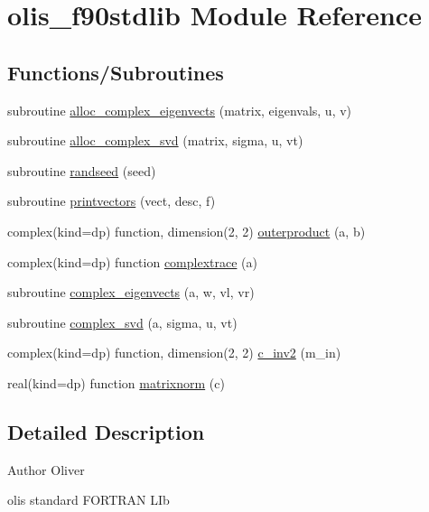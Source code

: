 \hypertarget{namespaceolis__f90stdlib}{}\section{olis\+\_\+f90stdlib Module Reference}
\label{namespaceolis__f90stdlib}
\subsection*{Functions/\+Subroutines}
\begin{DoxyCompactItemize}
\item 
subroutine \hyperlink{namespaceolis__f90stdlib_af0119bd404337367bc0727decf6dd89c}{alloc\+\_\+complex\+\_\+eigenvects} (matrix, eigenvals, u, v)
\item 
subroutine \hyperlink{namespaceolis__f90stdlib_a31420ff7579f33919c00c26753b56612}{alloc\+\_\+complex\+\_\+svd} (matrix, sigma, u, vt)
\item 
subroutine \hyperlink{namespaceolis__f90stdlib_a560e235cbabaf74da88a2ec97eda5628}{randseed} (seed)
\item 
subroutine \hyperlink{namespaceolis__f90stdlib_a9780b39329025edfdef71ce07e250808}{printvectors} (vect, desc, f)
\item 
complex(kind=dp) function, dimension(2, 2) \hyperlink{namespaceolis__f90stdlib_a9b646e61678500e78a9c48747a07bdf0}{outerproduct} (a, b)
\item 
complex(kind=dp) function \hyperlink{namespaceolis__f90stdlib_aaa6e9aabcf33a6f7052e1db5aa5dcf70}{complextrace} (a)
\item 
subroutine \hyperlink{namespaceolis__f90stdlib_a71c5b363b52932a5c69053149ac8cc25}{complex\+\_\+eigenvects} (a, w, vl, vr)
\item 
subroutine \hyperlink{namespaceolis__f90stdlib_a81e060e6ecfde9524a9732349a818db3}{complex\+\_\+svd} (a, sigma, u, vt)
\item 
complex(kind=dp) function, dimension(2, 2) \hyperlink{namespaceolis__f90stdlib_a162dd5131a39a62d7b95e2ebca4664a4}{c\+\_\+inv2} (m\+\_\+in)
\item 
real(kind=dp) function \hyperlink{namespaceolis__f90stdlib_a43175b11cfecf961b5e6e597cfb2f848}{matrixnorm} (c)
\end{DoxyCompactItemize}


\subsection{Detailed Description}
\begin{DoxyAuthor}{Author}
Oliver
\end{DoxyAuthor}
oli\textquotesingle{}s standard F\+O\+R\+T\+R\+AN L\+Ib 

